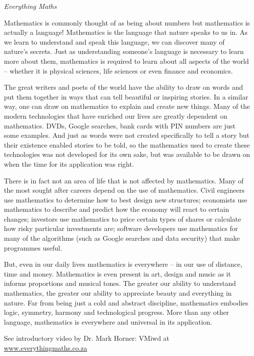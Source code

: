 \newpage
\thispagestyle{empty}

{\normalfont\sffamily\fontsize{22}\normalfont\itshape Everything Maths} \par

{ \Large
Mathematics is commonly thought of as being about numbers but mathematics is actually a language! Mathematics is the language that nature speaks to us in. As we learn to understand and speak this language, we can discover many of nature’s secrets. Just as understanding someone’s language is necessary to learn more about them, mathematics is required to learn about all aspects of the world -- whether it is physical sciences, life sciences or even finance and economics.\par


The great writers and poets of the world have the ability to draw on words and put them together in
ways that can tell beautiful or inspiring stories. In a similar way, one can draw on mathematics to
explain and create new things. Many of the modern technologies that have enriched our lives are
greatly dependent on mathematics. DVDs, Google searches, bank cards with PIN numbers are just
some examples. And just as words were not created specifically to tell a story but their existence enabled
stories to be told, so the mathematics used to create these technologies was not developed for its own sake,
but was available to be drawn on when the time for its application was right.\par


There is in fact not an area of life that is not affected by mathematics. Many of the most sought after
careers depend on the use of mathematics. Civil engineers use mathematics to determine how to best
design new structures; economists use mathematics to describe and predict how the economy will react
to certain changes; investors use mathematics to price certain types of shares or calculate how risky
particular investments are; software developers use mathematics for many of the algorithms (such as
Google searches and data security) that make programmes useful.\par



But, even in our daily lives mathematics is everywhere – in our use of distance, time and money.
Mathematics is even present in art, design and music as it informs proportions and musical tones. The
greater our ability to understand mathematics, the greater our ability to appreciate beauty and
everything in nature. Far from being just a cold and abstract discipline, mathematics
embodies logic, symmetry, harmony and technological progress. More than any other language,
mathematics is everywhere and universal in its application.\par


See introductory video by Dr. Mark Horner:  VMiwd at \underline{www.everythingmaths.co.za}



}





